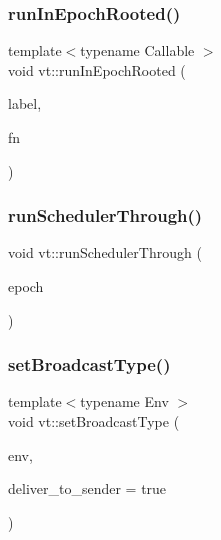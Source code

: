 \mbox{\label{namespacevt_af80867582a504d0f3cf4e2d95596645b}} 
\subsubsection{\texorpdfstring{run\+In\+Epoch\+Rooted()}{runInEpochRooted()}\hspace{0.1cm}{\footnotesize\ttfamily [2/2]}}
{\footnotesize\ttfamily template$<$typename Callable $>$ \\
void vt\+::run\+In\+Epoch\+Rooted (\begin{DoxyParamCaption}\item[{std\+::string const \&}]{label,  }\item[{Callable \&\&}]{fn }\end{DoxyParamCaption})}

\mbox{\label{namespacevt_aa550774c1c9c668176ce535fd7d58fb0}} 
\subsubsection{\texorpdfstring{run\+Scheduler\+Through()}{runSchedulerThrough()}}
{\footnotesize\ttfamily void vt\+::run\+Scheduler\+Through (\begin{DoxyParamCaption}\item[{\hyperlink{namespacevt_a81d11b28122d43bf9834577e4a06440f}{Epoch\+Type}}]{epoch }\end{DoxyParamCaption})}

\mbox{\label{namespacevt_af6e10f3d27abb3321ca34830880c0f7a}} 
\subsubsection{\texorpdfstring{set\+Broadcast\+Type()}{setBroadcastType()}}
{\footnotesize\ttfamily template$<$typename Env $>$ \\
void vt\+::set\+Broadcast\+Type (\begin{DoxyParamCaption}\item[{Env \&}]{env,  }\item[{bool}]{deliver\+\_\+to\+\_\+sender = {\ttfamily true} }\end{DoxyParamCaption})\hspace{0.3cm}{\ttfamily [inline]}}



